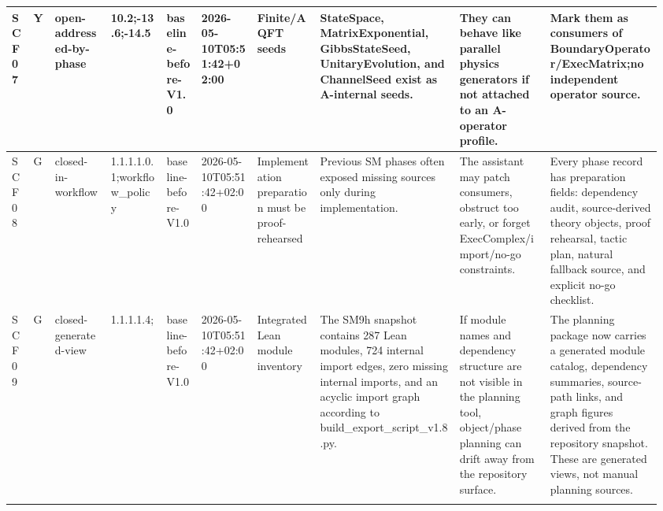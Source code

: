 \begin{longtable}{L{0.03\linewidth} L{0.026\linewidth} L{0.087\linewidth} L{0.085\linewidth} L{0.052\linewidth} L{0.085\linewidth} L{0.095\linewidth} L{0.205\linewidth} L{0.13\linewidth} L{0.165\linewidth}}
SCF07 & Y & open-addressed-by-phase & 10.2;-13.6;-14.5 & baseline-before-V1.0 & 2026-05-10T05:51:42+02:00 & Finite/\allowbreak{}AQFT seeds & StateSpace, MatrixExponential, GibbsStateSeed, UnitaryEvolution, and ChannelSeed exist as A-internal seeds. & They can behave like parallel physics generators if not attached to an A-operator profile. & Mark them as consumers of BoundaryOperator/\allowbreak{}ExecMatrix;\newline no independent operator source.\\
\hline
\addlinespace[0.24em]
SCF08 & G & closed-in-workflow & 1.1.1.1.0.1;\newline workflow\_policy & baseline-before-V1.0 & 2026-05-10T05:51:42+02:00 & Implementation preparation must be proof-rehearsed & Previous SM phases often exposed missing sources only during implementation. & The assistant may patch consumers, obstruct too early, or forget ExecComplex/\allowbreak{}import/\allowbreak{}no-go constraints. & Every phase record has preparation fields: dependency audit, source-derived theory objects, proof rehearsal, tactic plan, natural fallback source, and explicit no-go checklist.\\
\hline
\addlinespace[0.24em]
SCF09 & G & closed-generated-view & 1.1.1.1.4; & baseline-before-V1.0 & 2026-05-10T05:51:42+02:00 & Integrated Lean module inventory & The SM9h snapshot contains 287 Lean modules, 724 internal import edges, zero missing internal imports, and an acyclic import graph according to build\_export\_script\_v1.8.py. & If module names and dependency structure are not visible in the planning tool, object/\allowbreak{}phase planning can drift away from the repository surface. & The planning package now carries a generated module catalog, dependency summaries, source-path links, and graph figures derived from the repository snapshot. These are generated views, not manual planning sources.\\
\hline
\addlinespace[0.24em]

\end{longtable}
